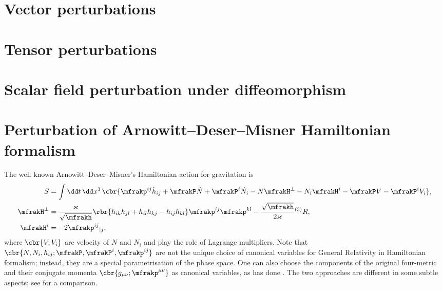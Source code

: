 \documentclass[a4paper,11pt]{article}
\begin{document}
\section{Vector perturbations}



\section{Tensor perturbations}



\section{Scalar field perturbation under diffeomorphism}


\section{Perturbation of Arnowitt--Deser--Misner Hamiltonian formalism}


The well known Arnowitt--Deser--Misner's Hamiltonian action for gravitation is 
\cite[ch.4.2.2]{Kiefer2012}
\begin{align}
S &= \int\dd t\,\dd x^3\,\cbr{
\mfrakp^{ij}\dot{h}_{ij} + \mfrakP\dot{N} + \mfrakP^i \dot{N}_i
-N\mfrakH^\perp - N_i\mfrakH^i - \mfrakP V - \mfrakP^i V_i}, \\
\mfrakH^\perp &= \frac{\varkappa}{\sqrt{\mfrakh}}\rbr{
h_{ik}h_{jl} + h_{il}h_{kj} - h_{ij}h_{kl}} \mfrakp^{ij}\mfrakp^{kl}
- \frac{\sqrt{\mfrakh}}{2\varkappa} {}^{(3)}R, \\
\mfrakH^i &= -2 \mfrakp^{ij}{}_{|j},
\end{align}
where $\cbr{V, V_i}$ are velocity of $N$ and $N_i$ and play the role of 
Lagrange multipliers. Note that $\cbr{N, N_i, h_{ij}; \mfrakP, \mfrakP^i, 
\mfrakp^{ij}}$ are not the unique choice of canonical variables for General 
Relativity in Hamiltonian formalism; instead, they are a special parametrisation 
of the phase space. One can also choose the components of the original 
four-metric and their conjugate momenta $\cbr{g_{\mu\nu}; \mfrakp^{\mu\nu}}$ as 
canonical variables, as \citeauthor{Dirac1958} has done \cite{Dirac1958}. The 
two approaches are different in some subtle aspects; see \cite{Kiriushcheva2008} 
for a comparison.
\end{document}
